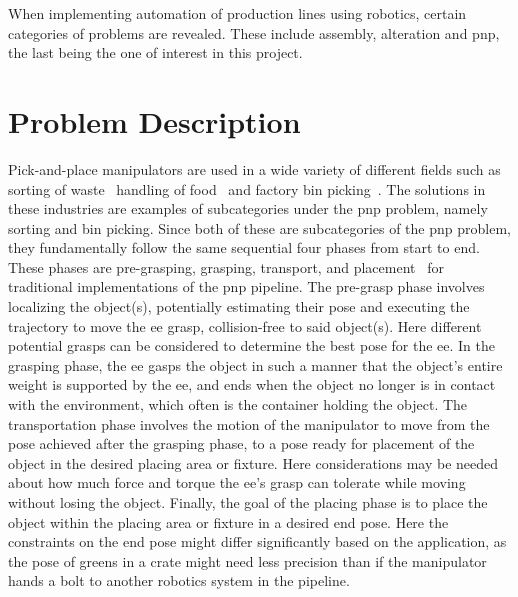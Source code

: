 When implementing automation of production lines using robotics, certain categories of problems are revealed. These include assembly, alteration and \gls{pnp}, the last being the one of interest in this project. 

\section{Problem Description}\label{sec:intro-problem-description}
Pick-and-place \gls{manipulator}s are used in a wide variety of different fields such as 
sorting of waste~\cite{robotic-pick-and-toss-facilitates-urban-waste-sorting}
handling of food~\cite{automation-of-mobile-pick-and-place-robotic-system-for-small-food-industry, development-of-a-food-handling-soft-robot-hand-considering-a-high-speed-pick-and-place-task} and factory bin picking~\cite{real-time-industrial-bin-picking-with-a-hybrid-deep-learning-engineering-approach, a-bin-picking-benchmark-for-systematic-evaluation-of-robotic-pick-and-place-systems, generic-development-of-bin-pick-and-place-system-based-on-robot-operating-system}. The solutions in these industries are examples of subcategories under the \gls{pnp} problem, namely sorting and bin picking. Since both of these are subcategories of the \gls{pnp} problem, they fundamentally follow the same sequential four phases from start to end. 
These phases are pre-grasping, grasping, transport, and placement~\cite{a-bin-picking-benchmark-for-systematic-evaluation-of-robotic-pick-and-place-systems} for traditional implementations of the \gls{pnp} pipeline.
The pre-grasp phase involves localizing the object(s), potentially estimating their pose and executing the trajectory to move the \gls{ee} grasp, collision-free to said object(s). Here different potential grasps can be considered to determine the best pose for the \gls{ee}.
In the grasping phase, the \gls{ee} gasps the object in such a manner that the object's entire weight is supported by the \gls{ee}, and ends when the object no longer is in contact with the environment, which often is the container holding the object.
The transportation phase involves the motion of the \gls{manipulator} to move from the pose achieved after the grasping phase, to a pose ready for placement of the object in the desired placing area or fixture. Here considerations may be needed about how much force and torque the \gls{ee}'s grasp can tolerate while moving without losing the object.
Finally, the goal of the placing phase is to place the object within the placing area or fixture in a desired end pose. Here the constraints on the end pose might differ significantly based on the application, as the pose of greens in a crate might need less precision than if the manipulator hands a bolt to another robotics system in the pipeline. \medskip

